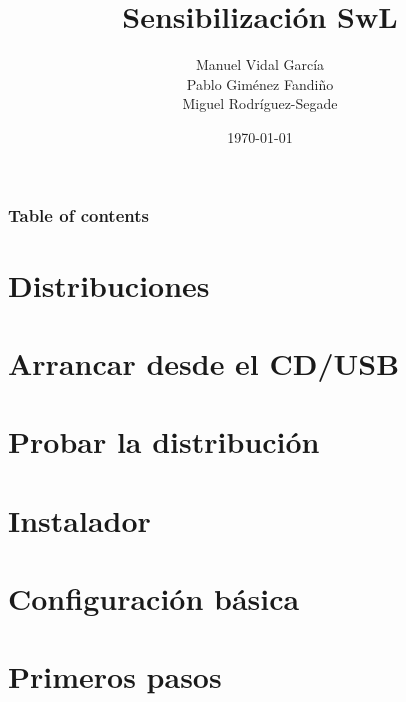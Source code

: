 \documentclass{beamer}
\title{Sensibilización SwL}
\author{Manuel Vidal García\\ Pablo Giménez Fandiño\\ Miguel Rodríguez-Segade}
\date{\today}
\begin{document}
\begin{frame}
    \titlepage
\end{frame}

\begin{frame} \frametitle{Table of contents}
    \tableofcontents
\end{frame}

\section{Distribuciones}


\section{Arrancar desde el CD/USB}

\section{Probar la distribución}

\section{Instalador}

\section{Configuración básica}

\section{Primeros pasos}
\end{document}
